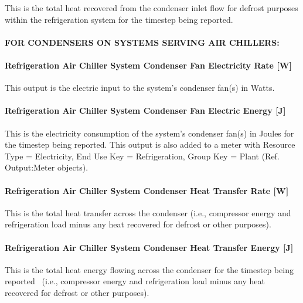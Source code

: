 This is the total heat recovered from the condenser inlet flow for defrost purposes within the refrigeration system for the timestep being reported.

\paragraph{FOR CONDENSERS ON SYSTEMS SERVING AIR CHILLERS:}\label{for-condensers-on-systems-serving-air-chillers}

\paragraph{Refrigeration Air Chiller System Condenser Fan Electricity Rate {[}W{]}}\label{refrigeration-air-chiller-system-condenser-fan-electric-power-w}

This output is the electric input to the system's condenser fan(s) in Watts.

\paragraph{Refrigeration Air Chiller System Condenser Fan Electric Energy {[}J{]}}\label{refrigeration-air-chiller-system-condenser-fan-electric-energy-j}

This is the electricity consumption of the system's condenser fan(s) in Joules for the timestep being reported. This output is also added to a meter with Resource Type = Electricity, End Use Key = Refrigeration, Group Key = Plant (Ref. Output:Meter objects).

\paragraph{Refrigeration Air Chiller System Condenser Heat Transfer Rate {[}W{]}}\label{refrigeration-air-chiller-system-condenser-heat-transfer-rate-w}

This is the total heat transfer across the condenser (i.e., compressor energy and refrigeration load minus any heat recovered for defrost or other purposes).

\paragraph{Refrigeration Air Chiller System Condenser Heat Transfer Energy {[}J{]}}\label{refrigeration-air-chiller-system-condenser-heat-transfer-energy-j}

This is the total heat energy flowing across the condenser for the timestep being reported~ (i.e., compressor energy and refrigeration load minus any heat recovered for defrost or other purposes).

